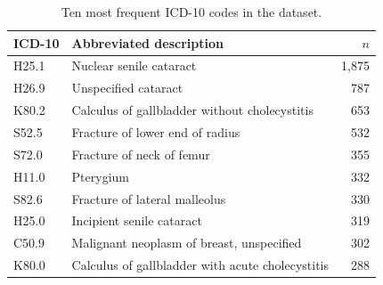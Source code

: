 \documentclass[sn-mathphys-num]{sn-jnl}
\begin{document}
\begin{table}[]
\centering
\caption{Ten most frequent ICD-10 codes in the dataset.}
\label{tab:top_cie10}
\begin{tabular}{llr}
\toprule
ICD-10 & Abbreviated description & $n$ \\
\midrule
H25.1 & Nuclear senile cataract         & 1{,}875 \\
H26.9 & Unspecified cataract            & 787 \\
K80.2 & Calculus of gallbladder without cholecystitis & 653 \\
S52.5 & Fracture of lower end of radius & 532 \\
S72.0 & Fracture of neck of femur       & 355 \\
H11.0 & Pterygium                        & 332 \\
S82.6 & Fracture of lateral malleolus   & 330 \\
H25.0 & Incipient senile cataract        & 319 \\
C50.9 & Malignant neoplasm of breast, unspecified & 302 \\
K80.0 & Calculus of gallbladder with acute cholecystitis & 288 \\
\bottomrule
\end{tabular}
\end{table}

    



    

    
    
\end{document}
